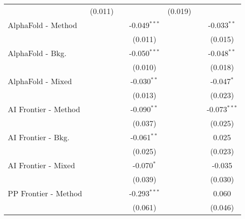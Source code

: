 \begin{tabular}{lcccccc}
                                  & (0.011)        &                &                & (0.019)        &               &   \\   
   AlphaFold - Method             &                &                & -0.049$^{***}$ &                &               & -0.033$^{**}$\\   
                                  &                &                & (0.011)        &                &               & (0.015)\\   
   AlphaFold - Bkg.               &                &                & -0.050$^{***}$ &                &               & -0.048$^{**}$\\   
                                  &                &                & (0.010)        &                &               & (0.018)\\   
   AlphaFold - Mixed              &                &                & -0.030$^{**}$  &                &               & -0.047$^{*}$\\   
                                  &                &                & (0.013)        &                &               & (0.023)\\   
   AI Frontier - Method           &                &                & -0.090$^{**}$  &                &               & -0.073$^{***}$\\   
                                  &                &                & (0.037)        &                &               & (0.025)\\   
   AI Frontier - Bkg.             &                &                & -0.061$^{**}$  &                &               & 0.025\\   
                                  &                &                & (0.025)        &                &               & (0.023)\\   
   AI Frontier - Mixed            &                &                & -0.070$^{*}$   &                &               & -0.035\\   
                                  &                &                & (0.039)        &                &               & (0.030)\\   
   PP Frontier - Method           &                &                & -0.293$^{***}$ &                &               & 0.060\\   
                                  &                &                & (0.061)        &                &               & (0.046)\\   

\end{tabular}
